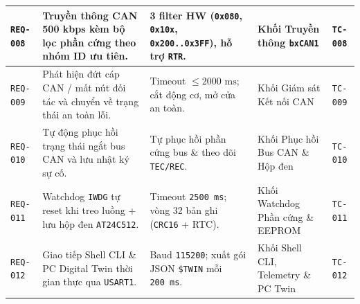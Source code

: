 \begin{xltabular}{\textwidth}{|C{1.45cm}|Y|L{3.25cm}|L{2.85cm}|C{1.35cm}|}
\hline
{}
\texttt{REQ-008} & Truyền thông CAN 500 kbps kèm bộ lọc phần cứng theo nhóm ID ưu tiên. & 3 filter HW (\texttt{0x080}, \texttt{0x10x}, \texttt{0x200..0x3FF}), hỗ trợ \texttt{RTR}. & Khối Truyền thông \texttt{bxCAN1} & \texttt{TC-008} \\
\hline
\texttt{REQ-009} & Phát hiện đứt cáp CAN / mất nút đối tác và chuyển về trạng thái an toàn lỗi. & Timeout $\le 2000\text{ ms}$; cắt động cơ, mở cửa an toàn. & Khối Giám sát Kết nối CAN & \texttt{TC-009} \\
\hline
{}
\texttt{REQ-010} & Tự động phục hồi trạng thái ngắt bus CAN và lưu nhật ký sự cố. & Tự phục hồi phần cứng bus \& theo dõi \texttt{TEC/REC}. & Khối Phục hồi Bus CAN \& Hộp đen & \texttt{TC-010} \\
\hline
\texttt{REQ-011} & Watchdog \texttt{IWDG} tự reset khi treo luồng + lưu hộp đen \texttt{AT24C512}. & Timeout \texttt{2500~ms}; vòng 32 bản ghi (\texttt{CRC16} + RTC). & Khối Watchdog Phần cứng \& EEPROM & \texttt{TC-011} \\
\hline
{}
\texttt{REQ-012} & Giao tiếp Shell CLI \& PC Digital Twin thời gian thực qua \texttt{USART1}. & Baud \texttt{115200}; xuất gói JSON \texttt{\$TWIN} mỗi \texttt{200~ms}. & Khối Shell CLI, Telemetry \& PC Twin & \texttt{TC-012} \\
\end{xltabular}
\endgroup

\clearpage
